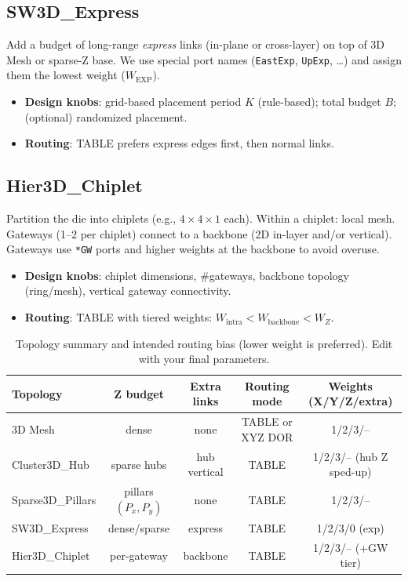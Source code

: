 \documentclass[11pt]{article}
\begin{document}
\subsection{SW3D\_Express}
Add a budget of long-range \emph{express} links (in-plane or cross-layer) on top of 3D Mesh or sparse-Z base. We use special port names (\texttt{EastExp}, \texttt{UpExp}, \ldots) and assign them the lowest weight ($W_{\text{EXP}}$).
\begin{itemize}[leftmargin=1em]
  \item \textbf{Design knobs}: grid-based placement period $K$ (rule-based); total budget $B$; (optional) randomized placement.
  \item \textbf{Routing}: TABLE prefers express edges first, then normal links.
\end{itemize}

\subsection{Hier3D\_Chiplet}
Partition the die into chiplets (e.g., $4{\times}4{\times}1$ each). Within a chiplet: local mesh. Gateways (1--2 per chiplet) connect to a backbone (2D in-layer and/or vertical). Gateways use \texttt{*GW} ports and higher weights at the backbone to avoid overuse.
\begin{itemize}[leftmargin=1em]
  \item \textbf{Design knobs}: chiplet dimensions, \#gateways, backbone topology (ring/mesh), vertical gateway connectivity.
  \item \textbf{Routing}: TABLE with tiered weights: $W_{\text{intra}} < W_{\text{backbone}} < W_Z$.
\end{itemize}

\begin{table}[t]
  \centering
  \caption{Topology summary and intended routing bias (lower weight is preferred). Edit with your final parameters.}
  \label{tab:topo-summary}
  \begin{tabular}{lcccc}
    \toprule
    \textbf{Topology} & \textbf{Z budget} & \textbf{Extra links} & \textbf{Routing mode} & \textbf{Weights (X/Y/Z/extra)} \\
    \midrule
    3D Mesh         & dense & none      & TABLE or XYZ DOR & 1/2/3/-- \\
    Cluster3D\_Hub  & sparse hubs & hub vertical & TABLE & 1/2/3/-- (hub Z sped-up) \\
    Sparse3D\_Pillars & pillars $(P_x,P_y)$ & none & TABLE & 1/2/3/-- \\
    SW3D\_Express   & dense/sparse & express & TABLE & 1/2/3/0 (exp) \\
    Hier3D\_Chiplet & per-gateway & backbone & TABLE & 1/2/3/-- (+GW tier) \\
    \bottomrule
  \end{tabular}
\end{table}
\end{document}
